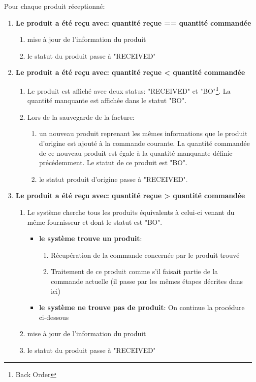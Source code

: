 Pour chaque produit réceptionné:
\begin{enumerate}

  \item \textbf{Le produit a été reçu avec: quantité reçue == quantité commandée}
  \begin{enumerate}
    \item mise à jour de l'information du produit
    \item le statut du produit passe à "RECEIVED"
  \end{enumerate}

  \newpara
  \item \textbf{Le produit a été reçu avec: quantité reçue < quantité commandée}
  \begin{enumerate}
    \item Le produit est affiché avec deux status: "RECEIVED" et "BO"\footnote{Back Order}. La quantité manquante est affichée dans le statut "BO".
    \newpage
    \item Lors de la sauvegarde de la facture:
    \begin{enumerate}
      \item un nouveau produit reprenant les mêmes informations que le produit d'origine est ajouté à la commande courante. La quantité commandée de ce nouveau produit est égale à la quantité manquante définie précédemment. Le statut de ce produit est "BO".
      \item le statut produit d'origine passe à "RECEIVED".
    \end{enumerate}
  \end{enumerate}
  
  \newpara
  \item \textbf{Le produit a été reçu avec: quantité reçue > quantité commandée}
  \begin{enumerate}
    \item Le système cherche tous les produits équivalents à celui-ci venant du même fournisseur et dont le statut est "BO". 
    \begin{itemize}
      \item \textbf{le système trouve un produit}: 
      \begin{enumerate}
        \item Récupération de la commande concernée par le produit trouvé
        \item Traitement de ce produit comme s'il faisait partie de la commande actuelle (il passe par les mêmes étapes décrites dans ici)
      \end{enumerate}
      \item \textbf{le système ne trouve pas de produit}: On continue la procédure ci-dessous
    \end{itemize}
    \item mise à jour de l'information du produit
    \item le statut du produit passe à "RECEIVED"
  \end{enumerate}
  

\end{enumerate}
